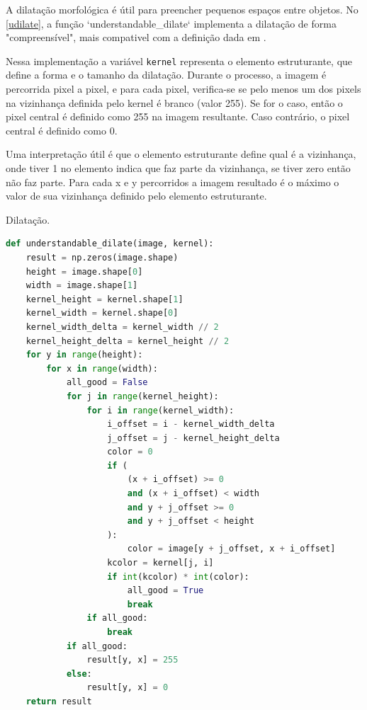 \documentclass[english, 
               brazil, 
               bsc] %
               {dcomp-abntex2}
\begin{document}
 A dilatação morfológica é útil para preencher pequenos espaços entre objetos. No \autoref{udilate}, a função `understandable\_dilate` implementa a dilatação de forma "compreensível", mais compativel com a definição dada em .


 Nessa implementação a variável \texttt{kernel} representa o elemento estruturante, que define a forma e o tamanho da dilatação. Durante o processo, a imagem é percorrida pixel a pixel, e para cada pixel, verifica-se se pelo menos um dos pixels na vizinhança definida pelo kernel é branco (valor 255). Se for o caso, então o pixel central é definido como 255 na imagem resultante. Caso contrário, o pixel central é definido como 0.


 Uma interpretação útil é que o elemento estruturante define qual é a vizinhança, onde tiver 1 no elemento indica que faz parte da vizinhança, se tiver zero então não faz parte. Para cada x e y percorridos a imagem resultado é o máximo o valor de sua vizinhança definido pelo elemento estruturante.


\begin{codigo}[h]
  \caption{\small Dilatação.}
 \label{udilate}
\begin{lstlisting}[language=python]
def understandable_dilate(image, kernel):
    result = np.zeros(image.shape)
    height = image.shape[0]
    width = image.shape[1]
    kernel_height = kernel.shape[1]
    kernel_width = kernel.shape[0]
    kernel_width_delta = kernel_width // 2
    kernel_height_delta = kernel_height // 2
    for y in range(height):
        for x in range(width):
            all_good = False
            for j in range(kernel_height):
                for i in range(kernel_width):
                    i_offset = i - kernel_width_delta
                    j_offset = j - kernel_height_delta
                    color = 0
                    if (
                        (x + i_offset) >= 0
                        and (x + i_offset) < width
                        and y + j_offset >= 0
                        and y + j_offset < height
                    ):
                        color = image[y + j_offset, x + i_offset]
                    kcolor = kernel[j, i]
                    if int(kcolor) * int(color):
                        all_good = True
                        break
                if all_good:
                    break
            if all_good:
                result[y, x] = 255
            else:
                result[y, x] = 0
    return result
\end{lstlisting}
\end{codigo}
\end{document}
